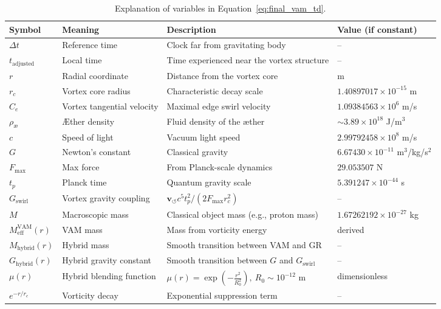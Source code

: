 \begin{table}[H]
    \centering
    \footnotesize
    \begin{tabular}{llll}
        \toprule
        \textbf{Symbol} & \textbf{Meaning} & \textbf{Description} & \textbf{Value (if constant)} \\
        \midrule
        $\Delta t$ & Reference time & Clock far from gravitating body & -- \\
        $t_\text{adjusted}$ & Local time & Time experienced near the vortex structure & -- \\
        $r$ & Radial coordinate & Distance from the vortex core & m \\
        $r_c$ & Vortex core radius & Characteristic decay scale & $1.40897017 \times 10^{-15}$ m \\
        $C_e$ & Vortex tangential velocity & Maximal edge swirl velocity & $1.09384563 \times 10^6$ m/s \\
        $\rho_\text{\ae}$ & Æther density & Fluid density of the æther & $\sim 3.89 \times 10^{18}$ J/m$^3$ \\
        $c$ & Speed of light & Vacuum light speed & $2.99792458 \times 10^8$ m/s \\
        $G$ & Newton's constant & Classical gravity & $6.67430 \times 10^{-11}$ m$^3$/kg/s$^2$ \\
        $F_{\text{max}}$ & Max force & From Planck-scale dynamics & $29.053507$ N \\
        $t_p$ & Planck time & Quantum gravity scale & $5.391247 \times 10^{-44}$ s \\
        $G_\text{swirl}$ & Vortex gravity coupling & $\mathbf{v}_{\scriptscriptstyle\boldsymbol{\circlearrowleft}} c^5 t_p^2 / (2 F_{\text{max}} r_c^2)$ & -- \\
        $M$ & Macroscopic mass & Classical object mass (e.g., proton mass) & $1.67262192 \times 10^{-27}$ kg \\
        $M_{\text{eff}}^\text{VAM}(r)$ & VAM mass & Mass from vorticity energy & derived \\
        $M_{\text{hybrid}}(r)$ & Hybrid mass & Smooth transition between VAM and GR & -- \\
        $G_{\text{hybrid}}(r)$ & Hybrid gravity constant & Smooth transition between $G$ and $G_\text{swirl}$ & -- \\
        $\mu(r)$ & Hybrid blending function & $\mu(r) = \exp\left(-\frac{r^2}{R_0^2}\right),\ R_0 \sim 10^{-12}$ m & dimensionless \\
        $e^{-r/r_c}$ & Vorticity decay & Exponential suppression term & -- \\
        \bottomrule
    \end{tabular}
    \caption{Explanation of variables in Equation~\ref{eq:final_vam_td}.}
    \label{tab:time_dilation_variables}
\end{table}
